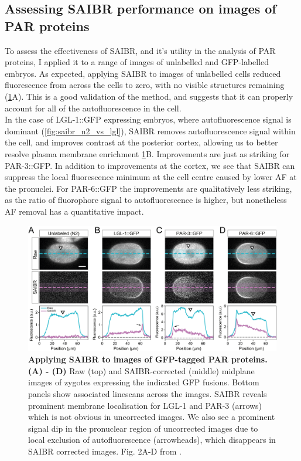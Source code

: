 \documentclass[12pt]{"report"}
\newcommand{\mycaption}[2]{\caption[#1]{\textbf{#1.} #2}}
\begin{document}
\subsection{Assessing SAIBR performance on images of PAR proteins}

To assess the effectiveness of SAIBR, and it’s utility in the analysis of PAR proteins, I applied it to a range of images of unlabelled and GFP-labelled embryos. As expected, applying SAIBR to images of unlabelled cells reduced fluorescence from across the cells to zero, with no visible structures remaining (\cref{fig:saibr_spatial_correction}A). This is a good validation of the method, and suggests that it can properly account for all of the autofluorescence in the cell. \\

In the case of LGL-1::GFP expressing embryos, where autofluorescence signal is dominant (\cref{fig:saibr_n2_vs_lgl}), SAIBR removes autofluorescence signal within the cell, and improves contrast at the posterior cortex, allowing us to better resolve plasma membrane enrichment \cref{fig:saibr_spatial_correction}B. Improvements are just as striking for PAR-3::GFP. In addition to improvements at the cortex, we see that SAIBR can suppress the local fluorescence minimum at the cell centre caused by lower AF at the pronuclei. For PAR-6::GFP the improvements are qualitatively less striking, as the ratio of fluorophore signal to autofluorescence is higher, but nonetheless AF removal has a quantitative impact.\\

\begin{figure}
\includegraphics[scale=0.9]{saibr_spatial_correction}
\centering
\mycaption{Applying SAIBR to images of GFP-tagged PAR proteins}{
\textbf{(A) - (D)} Raw (top) and SAIBR-corrected (middle) midplane images of zygotes expressing the indicated GFP fusions. Bottom panels show associated linescans across the images. SAIBR reveals prominent membrane localisation for LGL-1 and PAR-3 (arrows) which is not obvious in uncorrected images. We also see a prominent signal dip in the pronuclear region of uncorrected images due to local exclusion of autofluorescence (arrowheads), which disappears in SAIBR corrected images.
Fig. 2A-D from \textcite{Rodrigues2022}.}
\label{fig:saibr_spatial_correction}
\end{figure}
\end{document}
